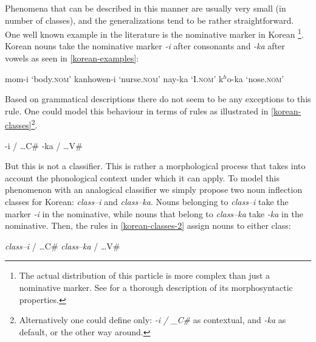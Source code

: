 Phenomena that can be described in this manner are usually very small (in number of classes), and the generalizations tend to be rather straightforward. One well known example in the literature is the nominative marker in Korean \autocite{Lee.1989, Song.2006, Suh.2008}\footnote{The actual distribution of this particle is more complex than just a nominative marker. See \textcite{Song.2006} for a thorough description of its morphosyntactic properties.}. Korean nouns take the nominative marker \textit{-i} after consonants and \textit{-ka} after vowels as seen in \ref{korean-examples}:

\begin{exe}
    \ex \label{korean-examples}
    \begin{xlist}
        \ex mom-i `body.\textsc{nom}'
        \ex kanhowen-i `nurse.\textsc{nom}'
        \ex nay-ka `I.\textsc{nom}'
        \ex k$^h$o-ka `nose.\textsc{nom}'
    \end{xlist}
\end{exe}

Based on grammatical descriptions there do not seem to be any exceptions to this rule. One could model this behaviour in terms of rules as illustrated in \ref{korean-classes}\footnote{Alternatively one could define only: \textit{-i / \_C\#} as contextual, and \textit{-ka} as default, or the other way around.}.

\begin{exe}
    \ex \label{korean-classes}
    \begin{xlist}
        \ex -i / \dots{}C\#
        \ex -ka / \dots{}V\#
    \end{xlist}
\end{exe}

But this is not a classifier. This is rather a morphological process that takes into account the phonological context under which it can apply. To model this phenomenon with an analogical classifier we simply propose two noun inflection classes for Korean: \textit{class--i} and \textit{class--ka}. Nouns belonging to \textit{class--i} take the marker \textit{-i} in the nominative, while nouns that belong to \textit{class--ka} take \textit{-ka} in the nominative. Then, the rules in \ref{korean-classes-2} assign nouns to either class:

\begin{exe}
    \ex \label{korean-classes-2}
    \begin{xlist}
        \ex \textit{class--i} / \dots{}C\#
        \ex \textit{class--ka} / \dots{}V\#
    \end{xlist}
\end{exe}

